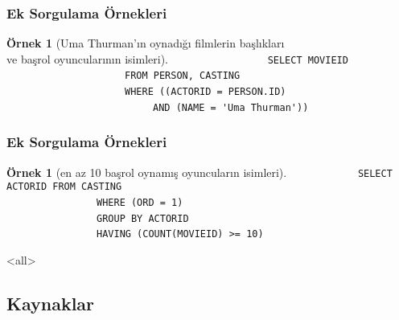 \documentclass[dvipsnames]{beamer}
\theoremstyle{definition}
\theoremstyle{example}
\newtheorem{ornek}[theorem]{Örnek}
\theoremstyle{plain}
\begin{document}
\begin{frame}[fragile]
  \frametitle{Ek Sorgulama Örnekleri}

  \begin{ornek}[Uma Thurman'ın oynadığı filmlerin başlıkları\\
                ve başrol oyuncularının isimleri]
~~~~~~~~~~~~~~~~~\lstinline!SELECT MOVIEID!\\
~~~~~~~~~~~~~~~~~~~~~\lstinline!FROM PERSON, CASTING!\\
~~~~~~~~~~~~~~~~~~~~~\lstinline!WHERE ((ACTORID = PERSON.ID)!\\
~~~~~~~~~~~~~~~~~~~~~~~~~~\lstinline!AND (NAME = 'Uma Thurman'))!\\
  \end{ornek}
\end{frame}

\begin{frame}[fragile]
  \frametitle{Ek Sorgulama Örnekleri}

  \begin{ornek}[en az 10 başrol oynamış oyuncuların isimleri]
~~~~~~~~~~~~\lstinline!SELECT ACTORID FROM CASTING!\\
~~~~~~~~~~~~~~~~\lstinline!WHERE (ORD = 1)!\\
\pause
~~~~~~~~~~~~~~~~\lstinline!GROUP BY ACTORID!\\
\pause
~~~~~~~~~~~~~~~~\lstinline!HAVING (COUNT(MOVIEID) >= 10)!\\
  \end{ornek}
\end{frame}

\mode
<all>

\subsection*{Kaynaklar}
\end{document}
